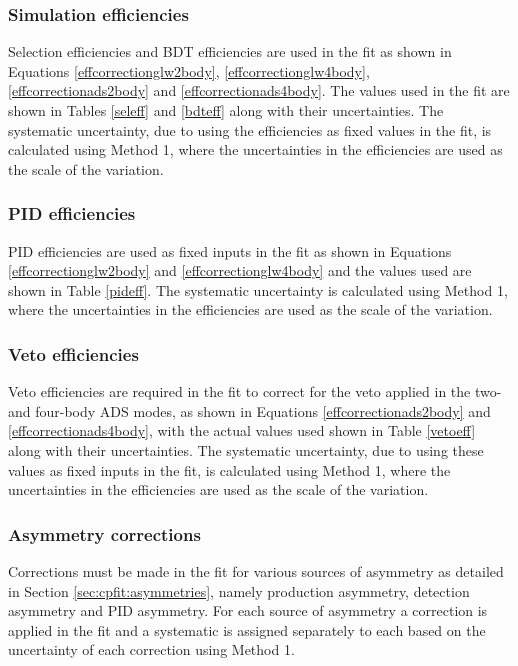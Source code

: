 \subsubsection{Simulation efficiencies}

Selection efficiencies and BDT efficiencies are used in the \CP fit as shown in Equations \ref{effcorrectionglw2body}, \ref{effcorrectionglw4body}, \ref{effcorrectionads2body} and \ref{effcorrectionads4body}. The values used in the \CP fit are shown in Tables \ref{seleff} and \ref{bdteff} along with their uncertainties. The systematic uncertainty, due to using the efficiencies as fixed values in the \CP fit, is calculated using Method 1, where the uncertainties in the efficiencies are used as the scale of the variation.

\subsubsection{PID efficiencies}

PID efficiencies are used as fixed inputs in the \CP fit as shown in Equations \ref{effcorrectionglw2body} and \ref{effcorrectionglw4body} and the values used are shown in Table \ref{pideff}. The systematic uncertainty is calculated using Method 1, where the uncertainties in the efficiencies are used as the scale of the variation.

\subsubsection{Veto efficiencies}

Veto efficiencies are required in the \CP fit to correct for the veto applied in the two- and four-body ADS modes, as shown in Equations \ref{effcorrectionads2body} and \ref{effcorrectionads4body}, with the actual values used shown in Table \ref{vetoeff} along with their uncertainties. The systematic uncertainty, due to using these values as fixed inputs in the \CP fit, is calculated using Method 1, where the uncertainties in the efficiencies are used as the scale of the variation.

\subsubsection{Asymmetry corrections}

Corrections must be made in the \CP fit for various sources of asymmetry as detailed in Section \ref{sec:cpfit:asymmetries}, namely production asymmetry, detection asymmetry and PID asymmetry. For each source of asymmetry a correction is applied in the \CP fit and a systematic is assigned separately to each based on the uncertainty of each correction using Method 1. 


